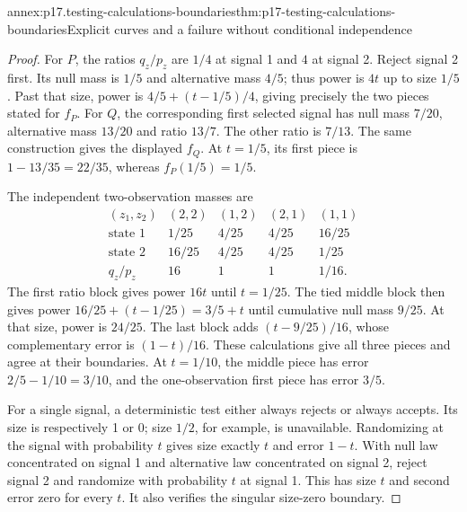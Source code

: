 \begin{annexitem}{annex:p17.testing-calculations-boundaries}{thm:p17-testing-calculations-boundaries}{Explicit curves and a failure without conditional independence}
\begin{proof}
For \(P\), the ratios \(q_z/p_z\) are \(1/4\) at signal 1 and
\(4\) at signal 2. Reject signal 2 first. Its null mass is \(1/5\)
and alternative mass \(4/5\); thus power is \(4t\) up to size \(1/5\).
Past that size, power is \(4/5+(t-1/5)/4\), giving precisely the two
pieces stated for \(f_P\).
For \(Q\), the corresponding first selected signal has null mass \(7/20\),
alternative mass \(13/20\) and ratio \(13/7\).
The other ratio is \(7/13\). The same construction gives the displayed
\(f_Q\). At \(t=1/5\), its first piece is
\(1-13/35=22/35\), whereas \(f_P(1/5)=1/5\).

The independent two-observation masses are
\[
 \begin{array}{c|cccc}
 (z_1,z_2)&(2,2)&(1,2)&(2,1)&(1,1)\\\hline
 \text{state 1}&1/25&4/25&4/25&16/25\\
 \text{state 2}&16/25&4/25&4/25&1/25\\
 q_z/p_z&16&1&1&1/16 .
 \end{array}
\]
The first ratio block gives power \(16t\) until \(t=1/25\).
The tied middle block then gives power
\(16/25+(t-1/25)=3/5+t\) until cumulative null mass \(9/25\).
At that size, power is \(24/25\). The last block adds
\((t-9/25)/16\), whose complementary error is \((1-t)/16\).
These calculations give all three pieces and agree at their boundaries.
At \(t=1/10\), the middle piece has error
\(2/5-1/10=3/10\), and the one-observation first piece has error \(3/5\).

For a single signal, a deterministic test either always rejects or
always accepts. Its size is respectively 1 or 0; size \(1/2\), for
example, is unavailable. Randomizing at the signal with probability
\(t\) gives size exactly \(t\) and error \(1-t\).
With null law concentrated on signal 1 and alternative law concentrated
on signal 2, reject signal 2 and randomize with probability \(t\) at
signal 1. This has size \(t\) and second error zero for every \(t\).
It also verifies the singular size-zero boundary.


\end{proof}
\end{annexitem}
